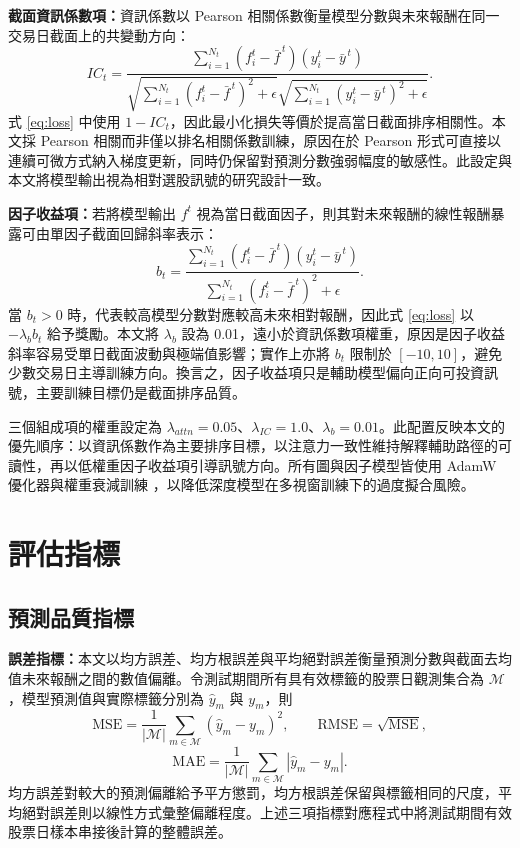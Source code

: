 \textbf{截面資訊係數項：}資訊係數以 Pearson 相關係數衡量模型分數與未來報酬在同一交易日截面上的共變動方向：
\begin{equation}
IC_t=
\frac{\sum_{i=1}^{N_t}(f_i^t-\bar{f}^{\,t})(y_i^t-\bar{y}^{\,t})}
{\sqrt{\sum_{i=1}^{N_t}(f_i^t-\bar{f}^{\,t})^2+\epsilon}
\sqrt{\sum_{i=1}^{N_t}(y_i^t-\bar{y}^{\,t})^2+\epsilon}} .
\end{equation}
式 \ref{eq:loss} 中使用 \(1-IC_t\)，因此最小化損失等價於提高當日截面排序相關性。本文採 Pearson 相關而非僅以排名相關係數訓練，原因在於 Pearson 形式可直接以連續可微方式納入梯度更新，同時仍保留對預測分數強弱幅度的敏感性。此設定與本文將模型輸出視為相對選股訊號的研究設計一致。

\textbf{因子收益項：}若將模型輸出 \(f^t\) 視為當日截面因子，則其對未來報酬的線性報酬暴露可由單因子截面回歸斜率表示：
\begin{equation}
b_t=
\frac{\sum_{i=1}^{N_t}(f_i^t-\bar{f}^{\,t})(y_i^t-\bar{y}^{\,t})}
{\sum_{i=1}^{N_t}(f_i^t-\bar{f}^{\,t})^2+\epsilon}.
\end{equation}
當 \(b_t>0\) 時，代表較高模型分數對應較高未來相對報酬，因此式 \ref{eq:loss} 以 \(-\lambda_b b_t\) 給予獎勵。本文將 \(\lambda_b\) 設為 0.01，遠小於資訊係數項權重，原因是因子收益斜率容易受單日截面波動與極端值影響；實作上亦將 \(b_t\) 限制於 \([-10,10]\)，避免少數交易日主導訓練方向。換言之，因子收益項只是輔助模型偏向正向可投資訊號，主要訓練目標仍是截面排序品質。

三個組成項的權重設定為 \(\lambda_{attn}=0.05\)、\(\lambda_{IC}=1.0\)、\(\lambda_b=0.01\)。此配置反映本文的優先順序：以資訊係數作為主要排序目標，以注意力一致性維持解釋輔助路徑的可讀性，再以低權重因子收益項引導訊號方向。所有圖與因子模型皆使用 AdamW 優化器與權重衰減訓練 \cite{loshchilov2019adamw}，以降低深度模型在多視窗訓練下的過度擬合風險。

\section{評估指標}
\label{sec:metrics}

\subsection{預測品質指標}
\textbf{誤差指標：}本文以均方誤差、均方根誤差與平均絕對誤差衡量預測分數與截面去均值未來報酬之間的數值偏離。令測試期間所有具有效標籤的股票日觀測集合為 \(\mathcal{M}\)，模型預測值與實際標籤分別為 \(\hat{y}_m\) 與 \(y_m\)，則
\begin{equation}
\mathrm{MSE}=\frac{1}{|\mathcal{M}|}\sum_{m\in\mathcal{M}}(\hat{y}_m-y_m)^2,
\qquad
\mathrm{RMSE}=\sqrt{\mathrm{MSE}},
\end{equation}
\begin{equation}
\mathrm{MAE}=\frac{1}{|\mathcal{M}|}\sum_{m\in\mathcal{M}}|\hat{y}_m-y_m|.
\end{equation}
均方誤差對較大的預測偏離給予平方懲罰，均方根誤差保留與標籤相同的尺度，平均絕對誤差則以線性方式彙整偏離程度。上述三項指標對應程式中將測試期間有效股票日樣本串接後計算的整體誤差。

